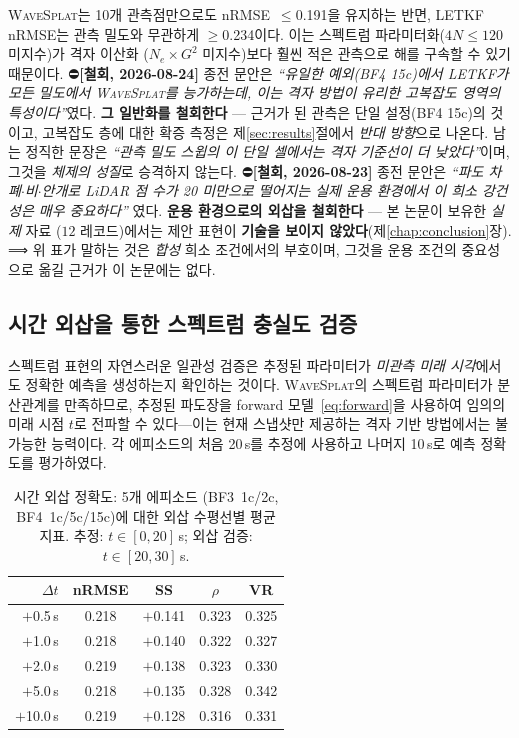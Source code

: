 \documentclass[11pt]{report}
\numberwithin{equation}{chapter}
\numberwithin{figure}{chapter}
\numberwithin{table}{chapter}
\newcommand{\WS}{\textsc{WaveSplat}}
\begin{document}
\WS{}는 10개 관측점만으로도 nRMSE~$\leq$0.191을 유지하는 반면,
LETKF nRMSE는 관측 밀도와 무관하게 $\geq$0.234이다.
이는 스펙트럼 파라미터화($4N \leq 120$ 미지수)가 격자 이산화
($N_e \times G^2$ 미지수)보다 훨씬 적은 관측으로 해를 구속할 수 있기 때문이다.
⛔\textbf{[철회, 2026-08-24]} 종전 문안은 \emph{``유일한 예외(BF4 15c)에서 LETKF가 모든
밀도에서 \WS{}를 능가하는데, 이는 격자 방법이 유리한 고복잡도 영역의 특성이다''}였다.
\textbf{그 일반화를 철회한다} --- 근거가 된 관측은 단일 설정(BF4 15c)의 것이고,
고복잡도 층에 대한 확증 측정은 제\ref{sec:results}절에서 \emph{반대 방향}으로 나온다.
남는 정직한 문장은 \emph{``관측 밀도 스윕의 이 단일 셀에서는 격자 기준선이 더 낮았다''}이며,
그것을 \emph{체제의 성질}로 승격하지 않는다.
⛔\textbf{[철회, 2026-08-23]} 종전 문안은 \emph{``파도 차폐$\cdot$비$\cdot$안개로
LiDAR 점 수가 20 미만으로 떨어지는 실제 운용 환경에서 이 희소 강건성은 매우 중요하다''}
였다. \textbf{운용 환경으로의 외삽을 철회한다} --- 본 논문이 보유한 \emph{실제} 자료
($12$ 레코드)에서는 제안 표현이 \textbf{기술을 보이지 않았다}(제\ref{chap:conclusion}장).
⟹ 위 표가 말하는 것은 \emph{합성} 희소 조건에서의 부호이며, 그것을 운용 조건의
중요성으로 옮길 근거가 이 논문에는 없다.

\subsection{시간 외삽을 통한 스펙트럼 충실도 검증}
\label{sec:forecast}

스펙트럼 표현의 자연스러운 일관성 검증은 추정된 파라미터가
\emph{미관측 미래 시각}에서도 정확한 예측을 생성하는지 확인하는 것이다.
\WS{}의 스펙트럼 파라미터가 분산관계를 만족하므로,
추정된 파도장을 forward 모델~\eqref{eq:forward}을 사용하여
임의의 미래 시점 $t$로 전파할 수 있다---이는 현재 스냅샷만
제공하는 격자 기반 방법에서는 불가능한 능력이다.
각 에피소드의 처음 20\,s를 추정에 사용하고
나머지 10\,s로 예측 정확도를 평가하였다.

\begin{table}[htbp]
\centering
\caption{시간 외삽 정확도: 5개 에피소드
(BF3~1c/2c, BF4~1c/5c/15c)에 대한 외삽 수평선별 평균 지표.
추정: $t \in [0, 20]$\,s; 외삽 검증: $t \in [20, 30]$\,s.}
\label{tab:forecast}
\begin{tabular}{rcccc}
\toprule
$\Delta t$ & nRMSE & SS & $\rho$ & VR \\
\midrule
$+$0.5\,s  & 0.218 & $+$0.141 & 0.323 & 0.325 \\
$+$1.0\,s  & 0.218 & $+$0.140 & 0.322 & 0.327 \\
$+$2.0\,s  & 0.219 & $+$0.138 & 0.323 & 0.330 \\
$+$5.0\,s  & 0.218 & $+$0.135 & 0.328 & 0.342 \\
$+$10.0\,s & 0.219 & $+$0.128 & 0.316 & 0.331 \\
\bottomrule
\end{tabular}
\end{table}
\end{document}
